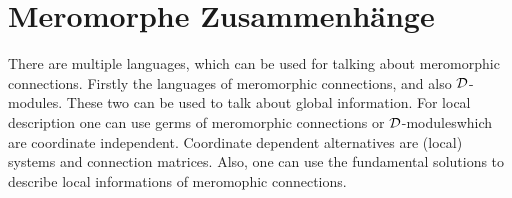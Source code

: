 \chapter{Meromorphe Zusammenhänge}
\begin{comment}
  \begin{multicols}{2}
    \textbf{Global}
    \begin{itemize}
      \item Meromorphic connection
      \item $\cD$-modules (global)
    \end{itemize}
    \columnbreak
    \textbf{Local}
    \begin{itemize}
      \item Germ of a meromophic connection
      \item $\cD$-modules (local)
      \item System
        \begin{itemize}
          \item coordinate dependent
        \end{itemize}
      \item Conection matrix
        \begin{itemize}
          \item coordinate dependent
        \end{itemize}
    \end{itemize}
  \end{multicols}
\end{comment}
There are multiple languages, which can be used for talking about meromorphic
connections. Firstly the languages of meromorphic connections, and also
$\mathcal{D}$-modules\TODO[global]. These two can be used to talk about global
information. For local description one can use germs of meromorphic connections
or $\mathcal{D}$-modules\TODO[local] which are coordinate independent. Coordinate
dependent alternatives are (local) systems and connection matrices. Also, one
can use the fundamental solutions to describe local informations of meromophic
connections.
\begin{comment}
  Siehe:
  \begin{multicols}{3}
    \begin{itemize}
      \item \cite{boalch} and \cite{thboalch}
      \item \cite{sabbah2007isomonodromic}
    \end{itemize}
    \columnbreak
    \begin{itemize}
      \item \cite{Varadarajan96linearmeromorphic}
    \end{itemize}
    \columnbreak
    \begin{itemize}
      \item \cite{Loday1994}
      \item \cite{Loday2014}
    \end{itemize}
  \end{multicols}
\end{comment}

